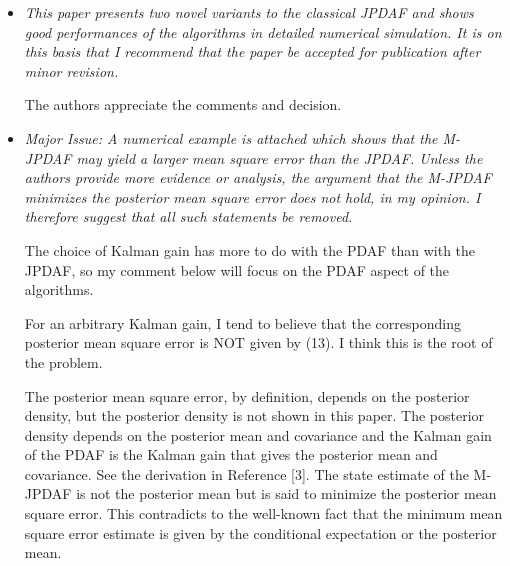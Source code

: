\documentclass[11pt]{article}
\begin{document}
\begin{itemize}

\subsection*{Reviewer 4}
\item {\itshape This paper presents two novel variants to the classical JPDAF and shows good performances of the algorithms in detailed numerical simulation. It is on this basis that I recommend that the paper be accepted for publication after minor revision.}

The authors appreciate the comments and decision.

\item {\itshape Major Issue:
A numerical example is attached which shows that the M-JPDAF may yield a larger mean square error than the JPDAF. Unless the authors provide more evidence or analysis, the argument that the M-JPDAF minimizes the posterior mean square error does not hold, in my opinion. I therefore suggest that all such statements be removed.

The choice of Kalman gain has more to do with the PDAF than with the JPDAF, so my comment below will focus on the PDAF aspect of the algorithms.

For an arbitrary Kalman gain, I tend to believe that the corresponding posterior mean square error is NOT given by (13). I think this is the root of the problem.

The posterior mean square error, by definition, depends on the posterior density, but the posterior density is not shown in this paper. The posterior density depends on the posterior mean and covariance and the Kalman gain of the PDAF is the Kalman gain that gives the posterior mean and covariance. See the derivation in Reference [3]. The state estimate of the M-JPDAF is not the posterior mean but is said to minimize the posterior mean square error. This contradicts to the well-known fact that the minimum mean square error estimate is given by the conditional expectation or the posterior mean.}


\end{itemize}
\end{document}
